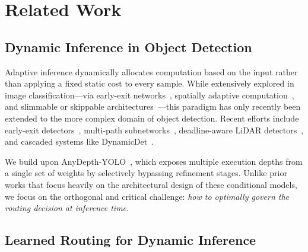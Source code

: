 \section{Related Work}
\label{sec:related}

\subsection{Dynamic Inference in Object Detection}
\label{sec:related_dynamic}

Adaptive inference dynamically allocates computation based on the input rather than applying a fixed static cost to every sample. 
While extensively explored in image classification---via early-exit networks~\cite{teera2016branchynet,huang2018multiscale,yang2020ranet,ilhan2024eenet}, spatially adaptive computation~\cite{figurnov2017spatially}, and slimmable or skippable architectures~\cite{yu2018slimmable,yu2019universally,cai2020ofa,wang2018skipnet,wu2018blockdrop,kang2024adaptive}---this paradigm has only recently been extended to the more complex domain of object detection. 
Recent efforts include early-exit detectors~\cite{yang2024adadet,kuhse2025anytimeyolo}, multi-path subnetworks~\cite{heo2020realtime}, deadline-aware LiDAR detectors~\cite{soyyigit2024valo}, and cascaded systems like DynamicDet~\cite{lin2023dynamicdet}. 

We build upon AnyDepth-YOLO~\cite{kang2026anydepth}, which exposes multiple execution depths from a single set of weights by selectively bypassing refinement stages. 
Unlike prior works that focus heavily on the architectural design of these conditional models, we focus on the orthogonal and critical challenge: \emph{how to optimally govern the routing decision at inference time}.



\subsection{Learned Routing for Dynamic Inference}
\label{sec:related_routing}

